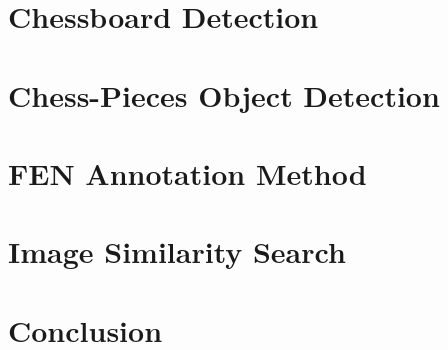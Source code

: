 \documentclass[conference]{IEEEtran}
\begin{document}
\section{Chessboard Detection}


\section{Chess-Pieces Object Detection}


\section{FEN Annotation Method}
 

\section{Image Similarity Search}


\section{Conclusion}




\vspace{12pt}
\end{document}
